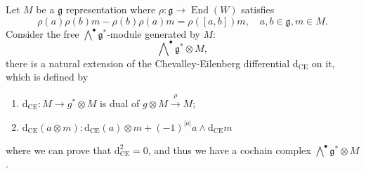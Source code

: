 \documentclass[10pt]{article}
\begin{document}
Let $ M$ be a $ \mathfrak{g}$ representation where $ \rho : \mathfrak{g} \rightarrow \operatorname{End}(W)$ satisfies
\begin{equation*}
  \rho(a) \rho(b) m - \rho(b) \rho(a) m = \rho([a,b]) m, \quad a,b \in \mathfrak{g}, m \in M.
\end{equation*}
Consider the free $\bigwedge^{\bullet} \mathfrak{g}^{*}$-module generated by $ M$:
\begin{equation*}
  \bigwedge\nolimits^{\bullet} \mathfrak{g}^{*} \otimes M,
\end{equation*}
there is a natural extension of the Chevalley-Eilenberg differential $ \mathrm{d} _{\mathrm{CE}}$ on it, which is defined by
\begin{enumerate}[(1)]
  \item $ \mathrm{d} _{\mathrm{CE}} : M \rightarrow g^{*}\otimes M$ is dual of $ g \otimes M \xrightarrow{\rho} M$;
  \item $ \mathrm{d} _{\mathrm{CE}}(a\otimes m) : \mathrm{d} _{\mathrm{CE}}(a) \otimes m + (-1)^{|a|} a \wedge \mathrm{d} _{\mathrm{CE}} m$
\end{enumerate}
where we can prove that $ \mathrm{d} _{\mathrm{CE}}^{2} = 0$, and thus we have a cochain complex $\bigwedge^{\bullet} \mathfrak{g}^{*} \otimes M$.
\end{document}
